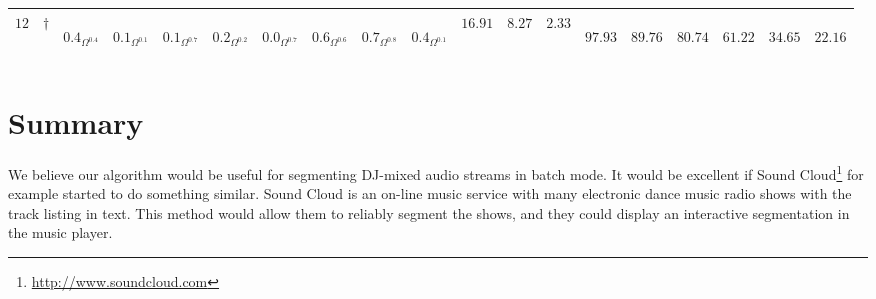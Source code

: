 \documentclass[twocolumn]{article}
\begin{document}
\begin{table}[t]
\begin{tabular}{|l|l|llllllll|lll|llllll|}
		\hline 
$12$ &	$\dagger$	&\begin{sideways}$0.4_{\Omega^{0.4}}$\end{sideways}&\begin{sideways}$0.1_{\Omega^{0.1}}$\end{sideways}&\begin{sideways}$0.1_{\Omega^{0.7}}$\end{sideways}&\begin{sideways}$0.2_{\Omega^{0.2}}$\end{sideways}&\begin{sideways}$0.0_{\Omega^{0.7}}$\end{sideways}&\begin{sideways}$0.6_{\Omega^{0.6}}$\end{sideways}&\begin{sideways}$0.7_{\Omega^{0.8}}$\end{sideways}&\begin{sideways}$0.4_{\Omega^{0.1}}$\end{sideways}&$16.91 $&$ 8.27 $& $ 2.33 $& \begin{sideways}$97.93$\end{sideways}& \begin{sideways}$89.76$\end{sideways}&\begin{sideways}$ 80.74$\end{sideways}&\begin{sideways}$ 61.22$\end{sideways}& \begin{sideways}$34.65$ \end{sideways}& \begin{sideways}$22.16$\end{sideways} \\
		
		
				\hline 
	\end{tabular}
	
	\label{tab:results}
\end{table}


\section{Summary}\label{conclusions}

We believe our algorithm would be useful for segmenting DJ-mixed audio streams in batch mode. It would be excellent if Sound Cloud\footnote{\url{http://www.soundcloud.com}} for example started to do something similar. Sound Cloud is an on-line music service with many electronic dance music radio shows with the track listing in text. This method would allow them to reliably segment the shows, and they could display an interactive segmentation in the music player. 
\end{document}
